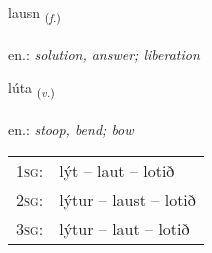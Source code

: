 \documentclass[frontgrid, backgrid]{flacards}\usepackage[]{graphicx}\usepackage[]{xcolor}
\begin{document}
\renewcommand{\blhead}{\vskip5pt {\small\bfseries\footnotesize Nafnorð | Noun }}
\renewcommand{\bcfoot}{\vskip5pt \hspace{2pt}{\small\bfseries\footnotesize 2K}}


{lausn \small{\textsubscript{(\textit{f.})}} \\[1ex] %
\textphonetic{[lœistn̥]} \\
en.: \emph{solution, answer; liberation} \\  [2ex]
\renewcommand*{\arraystretch}{0.8}
}

\renewcommand{\flhead}{\vskip5pt \fboxsep=0pt {\small\bfseries\footnotesize Sagnorð | Verb}}
\renewcommand{\fcfoot}{\vskip5pt \fboxsep=0pt \hspace{2pt}{\small\bfseries\footnotesize 2K}}

\renewcommand{\blhead}{\vskip5pt {\small\bfseries\footnotesize Sagnorð | Verb }}
\renewcommand{\bcfoot}{\vskip5pt \hspace{2pt}{\small\bfseries\footnotesize 2K}}


{lúta \small{\textsubscript{(\textit{v.})}} \\[1ex] %
\textphonetic{[luːta]} \\
en.: \emph{stoop, bend; bow} \\  [2ex]
\renewcommand*{\arraystretch}{0.8}
\begin{tabular}{p{1cm}l}
\textsc{1sg}: & lýt -- laut -- lotið \\ 
\textsc{2sg}: & lýtur -- laust -- lotið \\ 
\textsc{3sg}: & lýtur -- laut -- lotið \\ 
\end{tabular}
}

\renewcommand{\flhead}{\vskip5pt \fboxsep=0pt {\small\bfseries\footnotesize Nafnorð | Noun}}
\renewcommand{\fcfoot}{\vskip5pt \fboxsep=0pt \hspace{2pt}{\small\bfseries\footnotesize 2K}}
\end{document}
